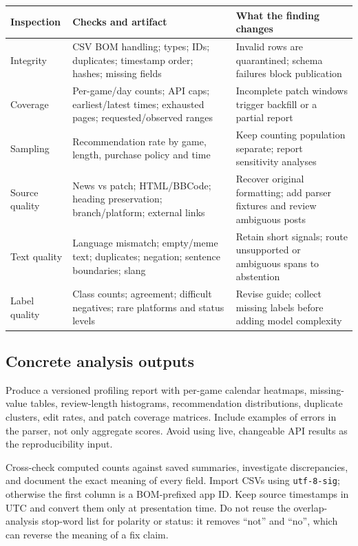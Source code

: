 \documentclass[10pt,letterpaper]{article}
\begin{document}
\begin{tabularx}{\linewidth}{p{1.0in}YY}
\toprule
Inspection & Checks and artifact & What the finding changes \\
\midrule
Integrity & CSV BOM handling; types; IDs; duplicates; timestamp order; hashes; missing fields & Invalid rows are quarantined; schema failures block publication \\
Coverage & Per-game/day counts; API caps; earliest/latest times; exhausted pages; requested/observed ranges & Incomplete patch windows trigger backfill or a partial report \\
Sampling & Recommendation rate by game, length, purchase policy and time & Keep counting population separate; report sensitivity analyses \\
Source quality & News vs patch; HTML/BBCode; heading preservation; branch/platform; external links & Recover original formatting; add parser fixtures and review ambiguous posts \\
Text quality & Language mismatch; empty/meme text; duplicates; negation; sentence boundaries; slang & Retain short signals; route unsupported or ambiguous spans to abstention \\
Label quality & Class counts; agreement; difficult negatives; rare platforms and status levels & Revise guide; collect missing labels before adding model complexity \\
\bottomrule
\end{tabularx}

\subsection{Concrete analysis outputs}
Produce a versioned profiling report with per-game calendar heatmaps, missing-value tables, review-length histograms, recommendation distributions, duplicate clusters, edit rates, and patch coverage matrices. Include examples of errors in the parser, not only aggregate scores. Avoid using live, changeable API results as the reproducibility input.

Cross-check computed counts against saved summaries, investigate discrepancies, and document the exact meaning of every field. Import CSVs using \texttt{utf-8-sig}; otherwise the first column is a BOM-prefixed app ID. Keep source timestamps in UTC and convert them only at presentation time. Do not reuse the overlap-analysis stop-word list for polarity or status: it removes ``not'' and ``no'', which can reverse the meaning of a fix claim.
\end{document}
